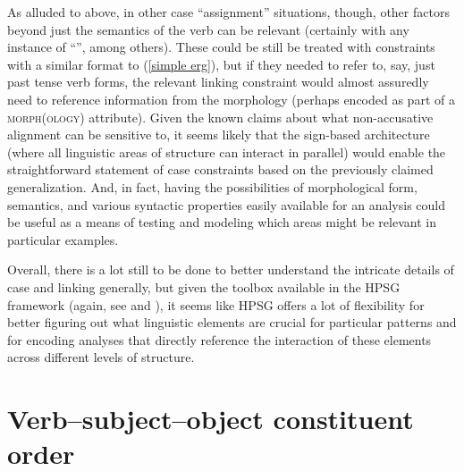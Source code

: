 \documentclass[output=paper
 	        ,biblatex
                ,babelshorthands
                ,newtxmath
                ,draftmode
                ,colorlinks, citecolor=brown
]{langscibook}
\begin{document}
As alluded to above, in other case ``assignment'' situations, though, other factors beyond just the semantics of the verb can be relevant (certainly with any instance of ``'', among others). These could be still be treated with constraints with a similar format to (\ref{simple erg}), but if they needed to refer to, say, just past tense verb forms, the relevant linking constraint would almost assuredly need to reference information from the morphology (perhaps encoded as part of a \textsc{morph(ology)} attribute). Given the known claims about what non-accusative alignment can be sensitive to,  it seems likely that the sign-based architecture (where all linguistic areas of structure can interact in parallel) would enable the straightforward statement of case constraints based on the previously claimed generalization. And, in fact, having the possibilities of morphological form, semantics, and various syntactic properties easily available for an analysis could be useful as a means of testing and modeling which areas might be relevant in particular examples.

Overall, there is a lot still to be done to better understand the intricate details of case and linking generally, but given the toolbox available in the HPSG framework (again, see  and ), it seems like HPSG offers a lot of flexibility for better figuring out what linguistic elements are crucial for particular patterns and for encoding analyses that directly reference the interaction of these elements across different levels of structure.      

\section{Verb--subject--object constituent order}
\label{ul:sec-vso}
\end{document}
